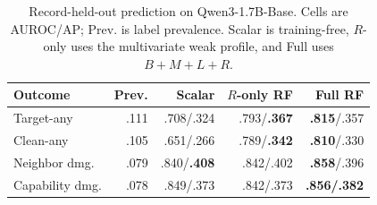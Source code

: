 \begin{table}[t]
\centering
\small
\renewcommand{\arraystretch}{1.05}
\setlength{\tabcolsep}{2.5pt}
\caption{Record-held-out prediction on Qwen3-1.7B-Base. Cells are AUROC/AP;
Prev. is label prevalence. Scalar is training-free, $R$-only uses the
multivariate weak profile, and Full uses $B+M+L+R$.}
\label{tab:cpu-controls}
\begin{tabular*}{\columnwidth}{@{\extracolsep{\fill}}lrrrr@{}}
\toprule
Outcome & Prev. & Scalar & $R$-only RF & Full RF \\
\midrule
Target-any & .111 & .708/.324 & .793/\textbf{.367} & \textbf{.815}/.357 \\
Clean-any & .105 & .651/.266 & .789/\textbf{.342} & \textbf{.810}/.330 \\
Neighbor dmg. & .079 & .840/\textbf{.408} & .842/.402 & \textbf{.858}/.396 \\
Capability dmg. & .078 & .849/.373 & .842/.373 & \textbf{.856/.382} \\
\bottomrule
\end{tabular*}

\end{table}
